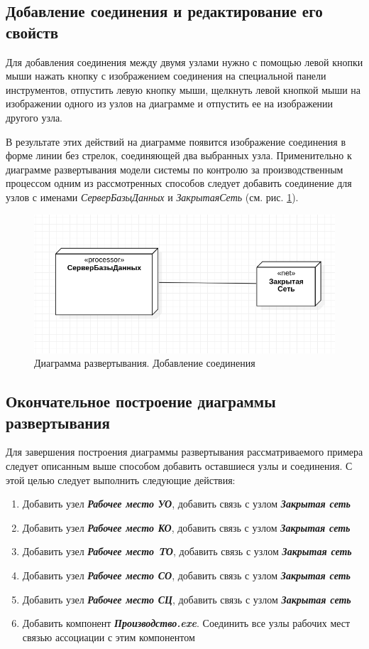 \documentclass[a4paper,12pt]{extreport}
\begin{document}
\subsection*{Добавление соединения и редактирование его свойств}
Для добавления соединения между двумя узлами нужно с помощью левой кнопки мыши нажать кнопку с изображением соединения на специальной панели инструментов, отпустить левую кнопку мыши, щелкнуть левой кнопкой мыши на изображении одного из узлов на диаграмме и отпустить ее на изображении другого узла. 

В результате этих действий на диаграмме появится изображение соединения в форме линии без стрелок, соединяющей два выбранных узла. Применительно к диаграмме развертывания модели системы по контролю за производственным процессом одним из рассмотренных способов следует добавить соединение для узлов с именами \textit{СерверБазыДанных} и \textit{ЗакрытаяСеть} (см. рис. \ref{fig:deployementbuscycle}).
\begin{figure}[h!]
	\centering
	\includegraphics[width=0.5\linewidth]{images/deployementbuscycle}
	\caption{Диаграмма развертывания. Добавление соединения}
	\label{fig:deployementbuscycle}
\end{figure}

\subsection*{Окончательное построение диаграммы развертывания}
Для завершения построения диаграммы развертывания рассматриваемого примера следует описанным выше способом добавить оставшиеся узлы и соединения. С этой целью следует выполнить следующие действия:
\begin{enumerate}
	\item Добавить узел \textit{\textbf{Рабочее место УО}}, добавить связь с узлом \textit{\textbf{Закрытая сеть}}
	
	\item Добавить узел \textit{\textbf{Рабочее место КО}}, добавить связь с узлом \textit{\textbf{Закрытая сеть}}
	
	\item Добавить узел \textit{\textbf{Рабочее место TО}}, добавить связь с узлом \textit{\textbf{Закрытая сеть}}
	
	\item Добавить узел \textit{\textbf{Рабочее место СО}}, добавить связь с узлом \textit{\textbf{Закрытая сеть}}
	
	\item Добавить узел \textit{\textbf{Рабочее место СЦ}}, добавить связь с узлом \textit{\textbf{Закрытая сеть}}
	\item Добавить компонент \textit{\textbf{Производство.exe}}. Соединить все узлы рабочих мест связью ассоциации с этим компонентом
\end{enumerate}
\end{document}
